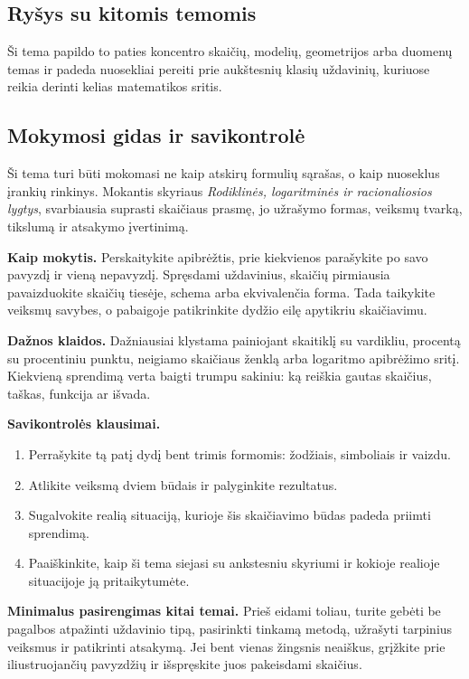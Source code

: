 \subsection{Ryšys su kitomis temomis}
Ši tema papildo to paties koncentro skaičių, modelių, geometrijos arba duomenų temas ir padeda nuosekliai pereiti prie aukštesnių klasių uždavinių, kuriuose reikia derinti kelias matematikos sritis.

\subsection{Mokymosi gidas ir savikontrolė}

Ši tema turi būti mokomasi ne kaip atskirų formulių sąrašas, o kaip nuoseklus įrankių rinkinys. Mokantis skyriaus \textit{Rodiklinės, logaritminės ir racionaliosios lygtys}, svarbiausia suprasti skaičiaus prasmę, jo užrašymo formas, veiksmų tvarką, tikslumą ir atsakymo įvertinimą.

\textbf{Kaip mokytis.} Perskaitykite apibrėžtis, prie kiekvienos parašykite po savo pavyzdį ir vieną nepavyzdį. Spręsdami uždavinius, skaičių pirmiausia pavaizduokite skaičių tiesėje, schema arba ekvivalenčia forma. Tada taikykite veiksmų savybes, o pabaigoje patikrinkite dydžio eilę apytikriu skaičiavimu.

\textbf{Dažnos klaidos.} Dažniausiai klystama painiojant skaitiklį su vardikliu, procentą su procentiniu punktu, neigiamo skaičiaus ženklą arba logaritmo apibrėžimo sritį. Kiekvieną sprendimą verta baigti trumpu sakiniu: ką reiškia gautas skaičius, taškas, funkcija ar išvada.

\textbf{Savikontrolės klausimai.}
\begin{enumerate}[label=\arabic*.]
\item Perrašykite tą patį dydį bent trimis formomis: žodžiais, simboliais ir vaizdu.
\item Atlikite veiksmą dviem būdais ir palyginkite rezultatus.
\item Sugalvokite realią situaciją, kurioje šis skaičiavimo būdas padeda priimti sprendimą.
\item Paaiškinkite, kaip ši tema siejasi su ankstesniu skyriumi ir kokioje realioje situacijoje ją pritaikytumėte.
\end{enumerate}

\textbf{Minimalus pasirengimas kitai temai.} Prieš eidami toliau, turite gebėti be pagalbos atpažinti uždavinio tipą, pasirinkti tinkamą metodą, užrašyti tarpinius veiksmus ir patikrinti atsakymą. Jei bent vienas žingsnis neaiškus, grįžkite prie iliustruojančių pavyzdžių ir išspręskite juos pakeisdami skaičius.

